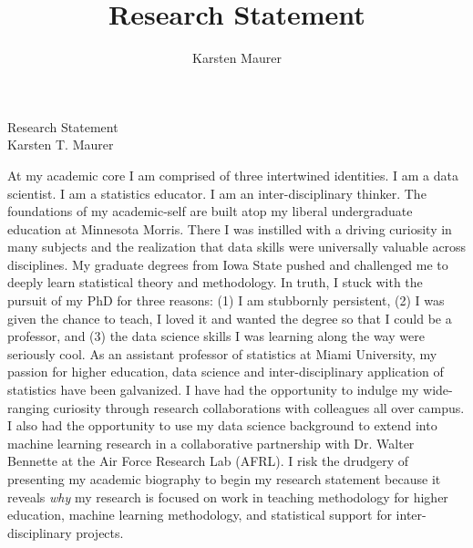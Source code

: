 \documentclass[letterpaper,12pt]{article}\usepackage[]{graphicx}\usepackage[]{color}
\title{Research Statement}
\author{Karsten Maurer}
\date{}
\begin{document}
\onehalfspacing

\begin{center}
\Large Research Statement \\
\normalsize Karsten T. Maurer \\
\end{center}

\vspace{.1in}

At my academic core I am comprised of three intertwined identities. I am a data scientist. I am a statistics educator. I am an inter-disciplinary thinker. The foundations of my academic-self are built atop my liberal undergraduate education at Minnesota Morris. There I was instilled with a driving curiosity in many subjects and the realization that data skills were universally valuable across disciplines. My graduate degrees from Iowa State pushed and challenged me to deeply learn statistical theory and methodology. In truth, I stuck with the pursuit of my PhD for three reasons: (1) I am stubbornly persistent, (2) I was given the chance to teach, I loved it and wanted the degree so that I could be a professor, and (3) the data science skills I was learning along the way were seriously cool. As an assistant professor of statistics at Miami University, my passion for higher education, data science and inter-disciplinary application of statistics have been galvanized. I have had the opportunity to indulge my wide-ranging curiosity through research collaborations with colleagues all over campus. I also had the opportunity to use my data science background to extend into machine learning research in a collaborative partnership with Dr. Walter Bennette at the Air Force Research Lab (AFRL). I risk the drudgery of presenting my academic biography to begin my research statement because it reveals {\it why} my research is focused on work in teaching methodology for higher education, machine learning methodology, and statistical support for inter-disciplinary projects. 
\end{document}
